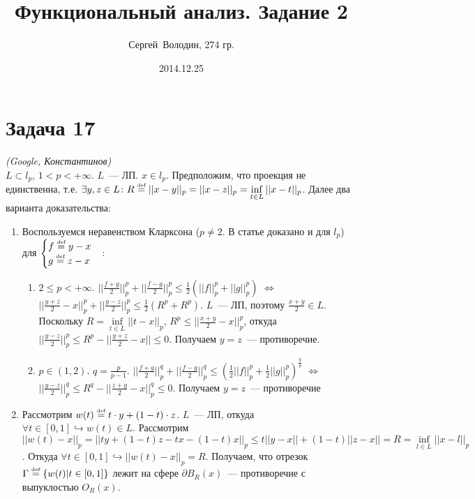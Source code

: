 \documentclass[a4paper]{article}
\date{2014.12.25}
\author{Сергей~Володин, 274 гр.}
\title{Функциональный анализ. Задание 2}
\def\eqdef{\overset{\mbox{\tiny def}}{=}}
\begin{document}
\maketitle
\section*{Задача 17}
{\em (Google, Константинов)}\\
$L\subset l_p$, $1<p<+\infty$. $L$~--- ЛП. $x\in l_p$. Предположим, что проекция не единственна, т.е. $\exists y,z\in L\colon R\eqdef||x-y||_p=||x-z||_p=\inf\limits_{t\in L}||x-t||_p$. Далее два варианта доказательства:\begin{enumerate}
\item Воспользуемся неравенством Кларксона ($p\neq 2$. В статье доказано и для $l_p$) для $\begin{cases}
f \eqdef y-x\\
g \eqdef z-x\\
\end{cases}$:\begin{enumerate}														\item $2\leqslant p<+\infty$. $||\frac{f+g}{2}||_p^p+||\frac{f-g}{2}||_p^p\leqslant\frac{1}{2}(||f||_p^p+||g||_p^p)$ $\Leftrightarrow$ $||\frac{y+z}{2}-x||_p^p+||\frac{y-z}{2}||_p^p\leqslant \frac{1}{2}(R^p+R^p)$. $L$~--- ЛП, поэтому $\frac{x+y}{2}\in L$. Поскольку $R=\inf\limits_{t\in L}||t-x||_p$, $R^p\leqslant ||\frac{x+y}{2}-x||^p_p$, откуда $||\frac{y-z}{2}||_p^p\leqslant R^p-||\frac{y+z}{2}-x||\leqslant 0$. Получаем $y=z$~--- противоречие.
\item $p\in (1,2)$. $q=\frac{p}{p-1}$. $||\frac{f+g}{2}||_p^q+||\frac{f-g}{2}||_p^q\leqslant \left(\frac{1}{2}||f||_p^p+\frac{1}{2}||g||_p^p\right)^{\frac{q}{p}}$ $\Leftrightarrow$ $||\frac{y-z}{2}||_p^q\leqslant R^q-||\frac{z+y}{2}-x||_p^q\leqslant 0$. Получаем $y=z$~--- противоречие
\end{enumerate}
\item Рассмотрим $w(t)\eqdef t\cdot y+(1-t)\cdot z$. $L$~--- ЛП, откуда $\forall t\in[0,1]\hookrightarrow w(t)\in L$. Рассмотрим $||w(t)-x||_p=||ty+(1-t)z-tx-(1-t)x||_p\leqslant t||y-x||+(1-t)||z-x||=R=\inf\limits_{l\in L}||x-l||_p$. Откуда $\forall t\in[0,1]\hookrightarrow||w(t)-x||_p=R$. Получаем, что отрезок $\Gamma\eqdef\{w(t)|t\in[0,1]\}$ лежит на сфере $\partial B_R(x)$~--- противоречие с выпуклостью $O_R(x)$.
\end{enumerate}
\end{document}
